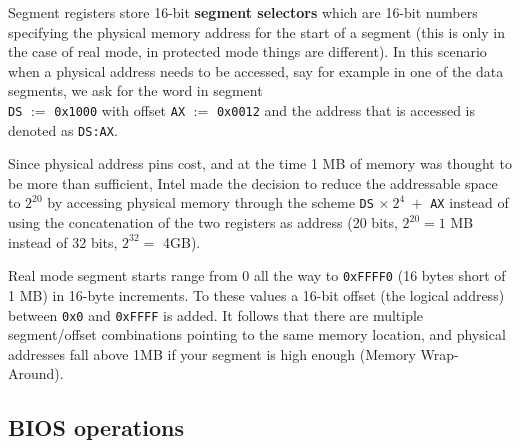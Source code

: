 \documentclass[twoside]{article}
\begin{document}
Segment registers store 16-bit \textbf{segment selectors} which are 16-bit numbers specifying the physical memory address for the start of a segment (this is only in the case of real mode, in protected mode things are different). In this scenario when a physical address needs to be accessed, say for example in one of the data segments, we ask for the word in segment \\ \texttt{DS} $:=$ \texttt{0x1000} with offset \texttt{AX} $:=$ \texttt{0x0012} and the address that is accessed is denoted as \texttt{DS:AX}.

Since physical address pins cost, and at the time 1 MB of memory was thought to be more than sufficient, Intel made the decision to reduce the addressable space to $2^{20}$ by accessing physical memory through the scheme \texttt{DS} $\times \ 2^4 \ + $ \texttt{AX} instead of using the concatenation of the two registers as address (20 bits, $2^{20} = 1$ MB instead of 32 bits, $2^{32} = $ 4GB).

Real mode segment starts range from 0 all the way to \texttt{0xFFFF0} (16 bytes short of 1 MB) in 16-byte increments. To these values a 16-bit offset (the logical address) between \texttt{0x0} and \texttt{0xFFFF} is added. It  follows that there are multiple segment/offset combinations pointing to the same memory location, and physical addresses fall above 1MB if your segment is high enough (Memory Wrap-Around). 

\subsection{BIOS operations}
\end{document}
